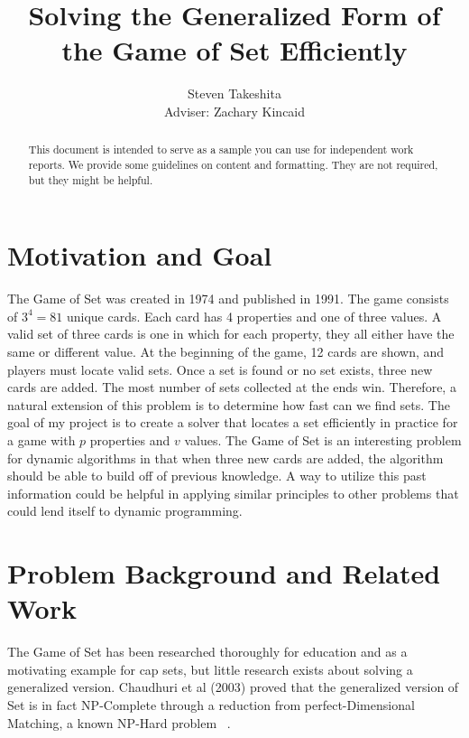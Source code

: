 \documentclass[pageno]{jpaper}
\begin{document}
\title{Solving the Generalized Form of the Game of Set Efficiently}

\author{Steven Takeshita\\Adviser: Zachary Kincaid}

\date{}
\maketitle

\thispagestyle{empty}
\doublespacing
\begin{abstract}
This document is intended to serve as a sample you can use for independent work reports.  We provide some guidelines on content and formatting.  They are not required, but they might be helpful.
\end{abstract}

\section{Motivation and Goal}

The Game of Set was created in 1974 and published in 1991. The game consists of $3^4 = 81$ unique cards. Each card has 4 properties and one of three values. A valid set of three cards is one in which for each property, they all either have the same or different value. At the beginning of the game, 12 cards are shown, and players must locate valid sets. Once a set is found or no set exists, three new cards are added. The most number of sets collected at the ends win. Therefore, a natural extension of this problem is to determine how fast can we find sets. The goal of my project is to create a solver that locates a set efficiently in practice for a game with $p$ properties and $v$ values. The Game of Set is an interesting problem for dynamic algorithms in that when three new cards are added, the algorithm should be able to build off of previous knowledge. A way to utilize this past information could be helpful in applying similar principles to other problems that could lend itself to dynamic programming. 


\section{Problem Background and Related Work}


The Game of Set has been researched thoroughly for education and as a motivating example for cap sets, but little research exists about solving a generalized version. Chaudhuri et al (2003) proved that the generalized version of Set is in fact NP-Complete through a reduction from perfect-Dimensional Matching, a known NP-Hard problem ~\cite{chaudhuri}.  
\end{document}
